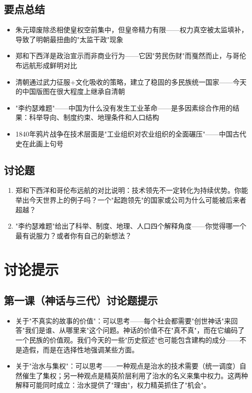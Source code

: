 \documentclass[a4paper,12pt]{ctexart}
\begin{document}
\subsection*{要点总结}
\begin{itemize}
  \item 朱元璋废除丞相使皇权空前集中，但皇帝精力有限——权力真空被太监填补，导致了明朝最扭曲的"太监干政"现象
  \item 郑和下西洋是政治宣示而非商业行为——它因"劳民伤财"而戛然而止，与哥伦布远航形成鲜明对比
  \item 清朝通过武力征服+文化吸收的策略，建立了稳固的多民族统一国家——今天的中国版图在很大程度上继承自清朝
  \item "李约瑟难题"——中国为什么没有发生工业革命——是多因素综合作用的结果：科举导向、制度约束、地理条件和人口结构
  \item 1840年鸦片战争在技术层面是"工业组织对农业组织的全面碾压"——中国古代史在此画上句号
\end{itemize}

\subsection*{讨论题}
\begin{enumerate}
  \item 郑和下西洋和哥伦布远航的对比说明：技术领先不一定转化为持续优势。你能举出今天世界上的例子吗？一个"起跑领先"的国家或公司为什么可能被后来者超越？
  \item "李约瑟难题"给出了科举、制度、地理、人口四个解释角度——你觉得哪一个最有说服力？或者你有自己的新想法？
\end{enumerate}

\section*{讨论提示}

\subsection*{第一课（神话与三代）讨论题提示}
\begin{itemize}
  \item 关于"不真实的故事的价值"：可以思考——每个社会都需要"创世神话"来回答"我们是谁、从哪里来"这个问题。神话的价值不在"真不真"，而在它编码了一个民族的价值观。我们今天的一些"历史叙述"也可能包含建构的成分——不是造假，而是在选择性地强调某些方面。
  \item 关于"治水与集权"：可以思考——一种观点是治水的技术需要（统一调度）自然催生了集权；另一种观点是精英阶层利用了治水的名义来集中权力。这两种解释可能同时成立：治水提供了"理由"，权力精英抓住了"机会"。
\end{itemize}
\end{document}
